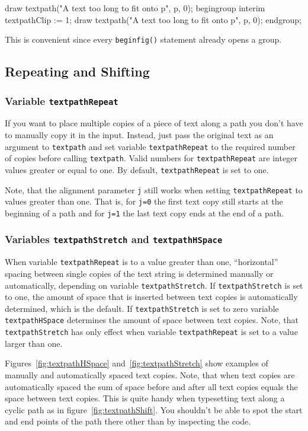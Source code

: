 \documentclass{article}
\newcommand*{\cmd}[1]{\texttt{#1}}
\newenvironment{listing}{%
  \small%
  \verbatim%
}{%
  \endverbatim%
}
\begin{document}
\begin{listing}
draw textpath("A text too long to fit onto p", p, 0);
begingroup
  interim textpathClip := 1;
  draw textpath("A text too long to fit onto p", p, 0);
endgroup;
\end{listing}

This is convenient since every \cmd{beginfig()} statement already opens a group.


\subsection{Repeating and Shifting}

\subsubsection{Variable \cmd{textpathRepeat}}
If you want to place multiple copies of a piece of text along a path you don't have to manually copy it in the input.  Instead, just pass the original text as an argument to \cmd{textpath} and set variable \cmd{textpathRepeat} to the required number of copies before calling \cmd{textpath}.  Valid numbers for \cmd{textpathRepeat} are integer values greater or equal to one.  By default, \cmd{textpathRepeat} is set to one.

Note, that the alignment parameter \cmd{j} still works when setting \cmd{textpathRepeat} to values greater than one.  That is, for \cmd{j=0} the first text copy still starts at the beginning of a path and for \cmd{j=1} the last text copy ends at the end of a path.

\subsubsection{Variables \cmd{textpathStretch} and \cmd{textpathHSpace}}
When variable \cmd{textpathRepeat} is to a value greater than one, ``horizontal'' spacing between single copies of the text string is determined manually or automatically, depending on variable \cmd{textpathStretch}.  If \cmd{textpathStretch} is set to one, the amount of space that is inserted between text copies is automatically determined, which is the default.  If \cmd{textpathStretch} is set to zero variable \cmd{textpathHSpace} determines the amount of space between text copies.  Note, that \cmd{textpathStretch} has only effect when variable \cmd{textpathRepeat} is set to a value larger than one.

Figures~\ref{fig:textpathHSpace} and~\ref{fig:textpathStretch} show examples of manually and automatically spaced text copies.  Note, that when text copies are automatically spaced the sum of space before and after all text copies equals the space between text copies.  This is quite handy when typesetting text along a cyclic path as in figure~\ref{fig:textpathShift}.  You shouldn't be able to spot the start and end points of the path there other than by inspecting the code.
\end{document}
